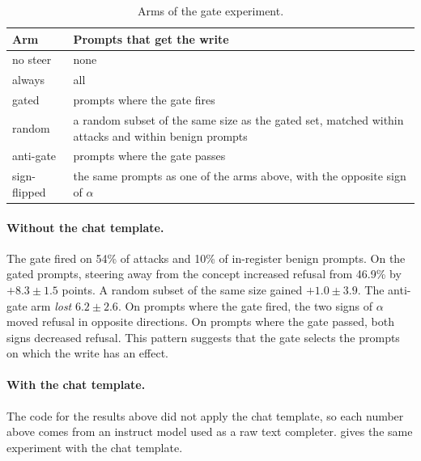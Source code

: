 \documentclass[11pt]{article}
\begin{document}
\begin{table}[h]
\centering
\small
\caption{Arms of the gate experiment.}
\label{tab:arms}
\begin{tabularx}{\textwidth}{l>{\raggedright\arraybackslash}X}
\toprule
Arm & Prompts that get the write \\
\midrule
no steer & none \\
always & all \\
gated & prompts where the gate fires \\
random & a random subset of the same size as the gated set, matched within attacks and within benign prompts \\
anti-gate & prompts where the gate passes \\
sign-flipped & the same prompts as one of the arms above, with the opposite sign of $\alpha$ \\
\bottomrule
\end{tabularx}
\end{table}

\paragraph{Without the chat template.} The gate fired on 54\% of attacks and 10\% of in-register benign
prompts. On the gated prompts, steering away from the concept increased refusal from 46.9\% by
$+8.3\pm1.5$ points. A random subset of the same size gained $+1.0\pm3.9$. The anti-gate arm \emph{lost}
$6.2\pm2.6$. On prompts where the gate fired, the two signs of $\alpha$ moved refusal in opposite
directions. On prompts where the gate passed, both signs decreased refusal. This pattern suggests that the
gate selects the prompts on which the write has an effect.

\paragraph{With the chat template.} The code for the results above did not apply the chat template, so each number above comes from an instruct model used as a raw text completer.  gives
the same experiment with the chat template.
\end{document}
